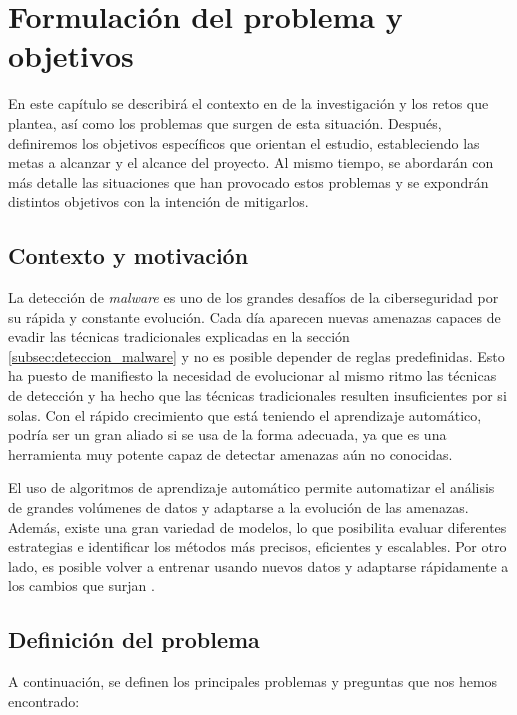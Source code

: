 \chapter{Formulación del problema y objetivos}
\label{ch:problema_y_objetivos}

En este capítulo se describirá el contexto en de la investigación y los retos que plantea, así como los problemas que surgen de esta situación. Después, definiremos los objetivos específicos que orientan el estudio, estableciendo las metas a alcanzar y el alcance del proyecto. Al mismo tiempo, se abordarán con más detalle las situaciones que han provocado estos problemas y se expondrán distintos objetivos con la intención de mitigarlos.

\section{Contexto y motivación}
\label{sec:contexto}

La detección de \textit{malware} es uno de los grandes desafíos de la ciberseguridad por su rápida y constante evolución. Cada día aparecen nuevas amenazas capaces de evadir las técnicas tradicionales explicadas en la sección \ref{subsec:deteccion_malware} y no es posible depender de reglas predefinidas. Esto ha puesto de manifiesto la necesidad de evolucionar al mismo ritmo las técnicas de detección y ha hecho que las técnicas tradicionales resulten insuficientes por si solas. Con el rápido crecimiento que está teniendo el aprendizaje automático, podría ser un gran aliado si se usa de la forma adecuada, ya que es una herramienta muy potente capaz de detectar amenazas aún no conocidas.

\vspace{1em}

El uso de algoritmos de aprendizaje automático permite automatizar el análisis de grandes volúmenes de datos y adaptarse a la evolución de las amenazas. Además, existe una gran variedad de modelos, lo que posibilita evaluar diferentes estrategias e identificar los métodos más precisos, eficientes y escalables. Por otro lado, es posible volver a entrenar usando nuevos datos y adaptarse rápidamente a los cambios que surjan \cite{campus}.

\section{Definición del problema}
\label{sec:definicion}

A continuación, se definen los principales problemas y preguntas que nos hemos encontrado:

